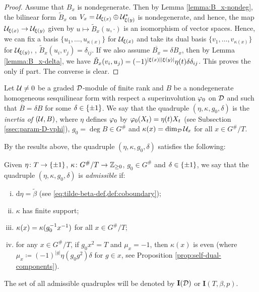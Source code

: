 \begin{proof}
	Assume that $B_x$ is nondegenerate.
	Then by Lemma \ref{lemma:B_x-nondeg}, the bilinear form $\tilde B_x$ on $V_x = \mathcal U_{\xi(x)} \oplus \mathcal U_{\xi(y)}^*$ is nondegenerate, and hence, the map $\mathcal U_{\xi(x)} \to \mathcal U_{\xi(y)}$ given by $u \mapsto \tilde B_x (u, \cdot)$  is an isomorphism of vector spaces.
	Hence, we can fix a basis $\{u_1, \ldots, u_{\kappa(x)} \}$ for $\mathcal U_{\xi(x)}$ and take its dual basis $\{v_1, \ldots, v_{\kappa(x)} \}$ for $\mathcal U_{\xi(y)}$, \ie, $\tilde B_x (u_i, v_j) = \delta_{ij}$.
	If we also assume $\overline{B_x} = \delta B_x$, then by Lemma \ref{lemma:B_x-delta}, we have $\tilde B_x (v_i, u_j) = (-1)^{|\xi(x)||\xi(y)|} \eta(t) \delta \delta_{ij}$.
	This proves the only if part.
	The converse is clear.
\end{proof}

\begin{defi}\label{def:parameter-of-(U,B)}
	Let $\mathcal U\neq 0$ be a graded $\mathcal{D}$-module of finite rank and $B$ be a nondegenerate homogeneous sesquilinear form with respect a superinvolution $\varphi_0$ on $\mathcal{D}$ and such that $\overline{B} = \delta B$ for some $\delta \in \{ \pm 1 \}$.
	We say that the quadruple $(\eta, \kappa, g_0, \delta)$ is the \emph{inertia of $(\mathcal U, B)$}, where $\eta$ defines $\varphi_0$ by $\varphi_0(X_t) = \eta(t)X_t$ (see Subsection \ref{ssec:param-D-vphi}), $g_0 = \deg B \in G^\#$ and $\kappa(x) = \dim_{\mathcal{D}} \mathcal U_x$ for all $x \in G^\#/T$.
\end{defi}

By the results above, the quadruple $(\eta, \kappa, g_0, \delta)$ satisfies the following:

\begin{defi}\label{defi:X(D)}
	Given $\eta\colon T \to \{ \pm 1 \}$,
	$\kappa\colon G^\#/T \to \mathbb{Z}_{\geq 0}$, $g_0 \in G^\#$ and $\delta \in \{ \pm 1 \}$, we say that the quadruple $(\eta, \kappa, g_0, \delta)$ is \emph{admissible} if:
	\begin{enumerate}[(i)]
		\item $\mathrm{d}\eta = \tilde\beta$ (see  \cref{eq:tilde-beta-def,def:coboundary}); \label{item:eta-is-eta}
		\item $\kappa$ has finite support; \label{item:kappa-finite-support}
		\item $\kappa(x) = \kappa(g_0^{-1} x^{-1})$ for all $x \in G^\#/T$; \label{item:kappa-duality}
		\item for any $x\in G^\#/T$, if $g_0 x^2 = T$ and $\mu_x = -1$, then $\kappa (x)$ is even (where \\$\mu_x\coloneqq (-1)^{|g|}\eta(g_0g^2)\delta$ for $g\in x$, see Proposition \ref{prop:self-dual-components}). \label{item:kappa-parity}
	\end{enumerate}
	The set of all admissible quadruples will be denoted by $\mathbf{I}(\mathcal{D})$ or $\mathbf{I}(T, \beta, p)$.
\end{defi}

